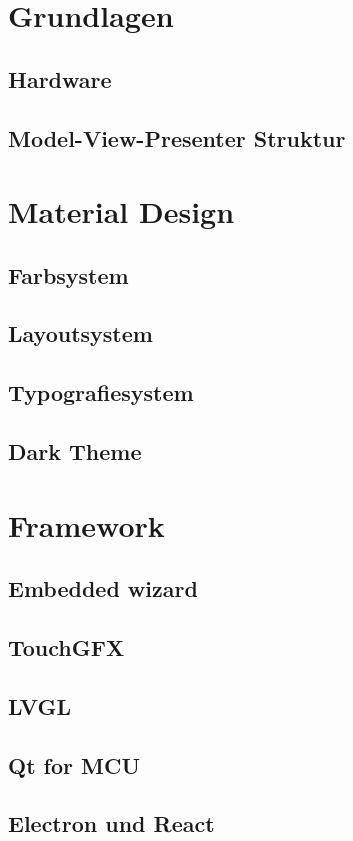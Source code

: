 \section{Grundlagen}

\subsection{Hardware}

\subsection{Model-View-Presenter Struktur}

\section{Material Design}

\subsection{Farbsystem}

\subsection{Layoutsystem}

\subsection{Typografiesystem}

\subsection{Dark Theme}

\section{Framework}

\subsection{Embedded wizard}

\subsection{TouchGFX}

\subsection{LVGL}

\subsection{Qt for MCU}

\subsection{Electron und React}